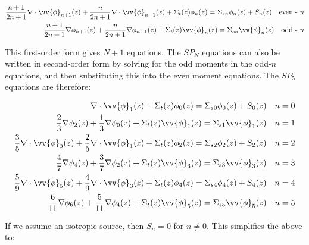 \documentclass[10pt]{article}
\begin{document}
\begin{equation}
\label{eq:SPNEquations}
\begin{aligned}
\frac{n+1}{2n+1}\nabla\cdot\vv{\phi}_{n+1}(z)+\frac{n}{2n+1}\nabla\cdot\vv{\phi}_{n-1}(z)+ \Sigma_t(z)\phi_n(z)=\Sigma_{sn}\phi_n(z)+ S_n(z)\quad \textrm{even - } n\\
\frac{n+1}{2n+1}\nabla\phi_{n+1}(z)+\frac{n}{2n+1}\nabla\phi_{n-1}(z)+ \Sigma_t(z)\vv{\phi}_n(z)=\Sigma_{sn}\vv{\phi}_n(z)\quad \textrm{odd - } n\\
\end{aligned}
 \end{equation}

This first-order form gives \(N+1\) equations. The \(SP_N\) equations can also be written in second-order form by solving for the odd moments in the odd-\(n\) equations, and then substituting this into the even moment equations. The \(SP_5\) equations are therefore:

\begin{equation}
\begin{aligned}
\nabla\cdot\vv{\phi}_{1}(z)+ \Sigma_t(z)\phi_0(z)=\Sigma_{s0}\phi_0(z)+ S_0(z)\quad n=0\\
\frac{2}{3}\nabla\phi_{2}(z)+\frac{1}{3}\nabla\phi_{0}(z)+ \Sigma_t(z)\vv{\phi}_1(z)=\Sigma_{s1}\vv{\phi}_1(z)\quad n=1\\
\frac{3}{5}\nabla\cdot\vv{\phi}_{3}(z)+\frac{2}{5}\nabla\cdot\vv{\phi}_{1}(z)+ \Sigma_t(z)\phi_2(z)=\Sigma_{s2}\phi_2(z)+ S_2(z)\quad n=2\\
\frac{4}{7}\nabla\phi_{4}(z)+\frac{3}{7}\nabla\phi_{2}(z)+ \Sigma_t(z)\vv{\phi}_3(z)=\Sigma_{s3}\vv{\phi}_3(z)\quad n=3\\
\frac{5}{9}\nabla\cdot\vv{\phi}_{5}(z)+\frac{4}{9}\nabla\cdot\vv{\phi}_{3}(z)+ \Sigma_t(z)\phi_4(z)=\Sigma_{s4}\phi_4(z)+ S_4(z)\quad n=4\\
\frac{6}{11}\nabla\phi_{6}(z)+\frac{5}{11}\nabla\phi_{4}(z)+ \Sigma_t(z)\vv{\phi}_5(z)=\Sigma_{s5}\vv{\phi}_5(z)\quad n=5\\
\end{aligned}
\end{equation}

If we assume an isotropic source, then \(S_n=0\) for \(n\neq0\). This simplifies the above to:
\end{document}
